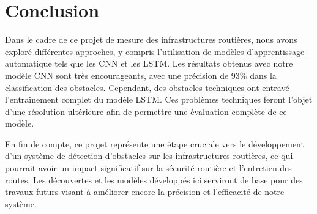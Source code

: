 \section{Conclusion}

Dans le cadre de ce projet de mesure des infrastructures routières, nous avons exploré différentes approches, y compris l'utilisation de modèles d'apprentissage automatique tels que les CNN et les LSTM. Les résultats obtenus avec notre modèle CNN sont très encourageants, avec une précision de 93\% dans la classification des obstacles. Cependant, des obstacles techniques ont entravé l'entraînement complet du modèle LSTM. Ces problèmes techniques feront l'objet d'une résolution ultérieure afin de permettre une évaluation complète de ce modèle.

En fin de compte, ce projet représente une étape cruciale vers le développement d'un système de détection d'obstacles sur les infrastructures routières, ce qui pourrait avoir un impact significatif sur la sécurité routière et l'entretien des routes. Les découvertes et les modèles développés ici serviront de base pour des travaux futurs visant à améliorer encore la précision et l'efficacité de notre système.